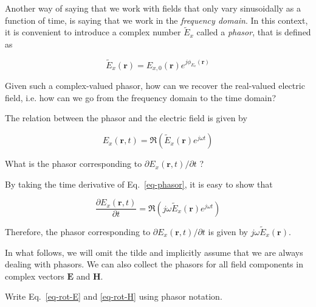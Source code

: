 Another way of saying that we work with fields that only vary sinusoidally as a function of time, is saying that we work in the \emph{frequency domain}. In this context, it is convenient to introduce a complex number $\tilde{E}_x$ called a \emph{phasor}, that is defined as

\begin{equation}
\tilde{E}_x(\mathbf{r})=E_{x,0}({\mathbf r}) e^{j \phi_{E_x}({\mathbf r})} \label{eq:phasor}
\end{equation}

\begin{cue}
Given such a complex-valued phasor, how can we recover the real-valued electric field, i.e. how can we go from the frequency domain to the time domain?
\end{cue}

\noindent{}The relation between the phasor and the electric field is given by

\begin{equation}
    E_x({\mathbf r},t) = \Re \left(\tilde{E}_x({\mathbf r}) e^{j \omega t}\right)\label{eq:phasor-time-dep}
\end{equation}

\begin{cue}
What is the phasor corresponding to $\partial E_x({\mathbf r},t) / \partial t$ ?
\end{cue}

By taking the time derivative of Eq.~\ref{eq-phasor}, it is easy to show that 

\begin{equation}
\frac{\partial E_x({\mathbf r},t)}{\partial t} = \Re \left(j \omega \tilde{E}_x({\mathbf r}) e^{j \omega t}\right)
\end{equation}

Therefore, the phasor corresponding to $\partial E_x({\mathbf r},t) / \partial t$ is given by $j \omega \tilde{E}_x({\mathbf r})$.

In what follows, we will omit the tilde and implicitly assume that we are always dealing with phasors. We can also collect the phasors for all field components in complex vectors ${\mathbf E}$ and ${\mathbf H}$. 

\begin{cue}
Write Eq.~\ref{eq-rot-E} and \ref{eq-rot-H} using phasor notation.
\end{cue}

